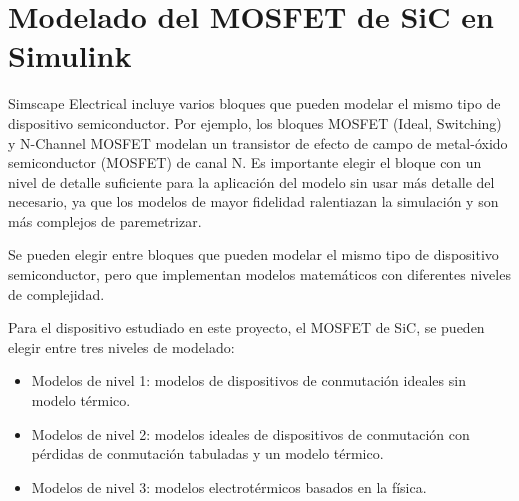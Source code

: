 \chapter{Modelado del MOSFET de SiC en Simulink}

Simscape Electrical incluye varios bloques que pueden modelar el mismo tipo de dispositivo semiconductor. Por ejemplo, los bloques MOSFET (Ideal, Switching) y N-Channel MOSFET modelan un transistor de efecto de campo de metal-óxido semiconductor (MOSFET) de canal N. Es importante elegir el bloque con un nivel de detalle suficiente para la aplicación del modelo sin usar más detalle del necesario, ya que los modelos de mayor fidelidad ralentiazan la simulación y son más complejos de paremetrizar.

Se pueden elegir entre bloques que pueden modelar el mismo tipo de dispositivo semiconductor, pero que implementan modelos matemáticos con diferentes niveles de complejidad.

Para el dispositivo estudiado en este proyecto, el MOSFET de SiC, se pueden elegir entre tres niveles de modelado:

\begin{itemize}
    \item Modelos de nivel 1: modelos de dispositivos de conmutación ideales sin modelo térmico.
    \item Modelos de nivel 2: modelos ideales de dispositivos de conmutación con pérdidas de conmutación tabuladas y un modelo térmico.
    \item Modelos de nivel 3: modelos electrotérmicos basados en la física.
\end{itemize}

